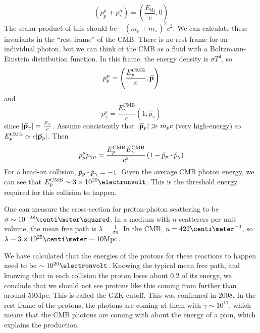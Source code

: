 \documentclass[a4paper,twoside,master.tex]{subfiles}
\begin{document}
\begin{equation}
    (p^{\mu}_p + p^{\mu}_{\gamma}) = \left( \frac{E_{\text{th}}}{c}, 0 \right)
\end{equation}
The scalar product of this should be $ - (m_p + m_{\pi})^2 c^2 $. We can calculate these invariants in the ``rest frame'' of the CMB. There is no rest frame for an individual photon, but we can think of the CMB as a fluid with a Boltzmann-Einstein distribution function. In this frame, the energy density is $ \sigma T^4 $, so
\begin{equation}
    p^{\mu}_p = \left( \frac{E_p^{\text{CMB}}}{c}, \va{p} \right)
\end{equation}
and
\begin{equation}
    p^{\mu}_{\gamma} = \frac{E_{\gamma}^{\text{CMB}}}{c} \left( 1, \hat{p}_{\gamma} \right)
\end{equation}
since $ \abs{\va{p}_{\gamma}} = \frac{E_{\gamma}}{c} $. Assume consistently that $ \abs{\va{p}_p} \gg m_p c $ (very high-energy) so $ E_p^{\text{CMB}} \simeq c \abs{\va{p}_p} $. Then
\begin{equation}
    p^{\mu}_{p} p_{\gamma \mu} = \frac{E_p^{\text{CMB}} E_{\gamma}^{\text{CMB}}}{c^2}\left( 1 - \hat{p}_p \vdot \hat{p}_{\gamma} \right)
\end{equation}
For a head-on collision, $ \hat{p}_p \vdot \hat{p}_{\gamma} = -1 $. Given the average CMB photon energy, we can see that $ E_p^{\text{CMB}} \sim 3 \times 10^{20} \electronvolt $. This is the threshold energy required for this collision to happen.

One can measure the cross-section for proton-photon scattering to be $ \sigma \sim 10^{-28} \centi\meter\squared $. In a medium with $ n $ scatterers per unit volume, the mean free path is $ \lambda = \frac{1}{\sigma n} $. In the CMB, $ n = 422\centi\meter^{-3} $, so $ \lambda \sim 3 \times 10^{25} \centi\meter \sim 10 \text{Mpc} $.


We have calculated that the energies of the protons for these reactions to happen need to be $ \sim 10^{20} \electronvolt $. Knowing the typical mean free path, and knowing that in each collision the proton loses about $ 0.2 $ of its energy, we conclude that we should not see protons like this coming from further than around $ 50 \text{Mpc} $. This is called the GZK cutoff. This was confirmed in 2008. In the rest frame of the protons, the photons are coming at them with $ \gamma \sim 10^{11} $, which means that the CMB photons are coming with about the energy of a pion, which explains the production.
\end{document}
